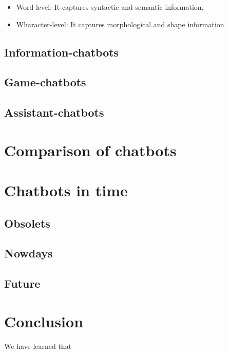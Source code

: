 \documentclass[12pt,twoside]{article}
\theoremstyle{plain}
\theoremstyle{definition}
\theoremstyle{remark}
\begin{document}
		\begin{itemize}
			\item Word-level: It captures syntactic and semantic information,
			\item Wharacter-level: It captures morphological and shape information.

		\end{itemize}
		
	 
		
		
		
	
		
	

	\subsection{Information-chatbots}
	\label{sec:information}

	\subsection{Game-chatbots}
	\label{sec:game}

	\subsection{Assistant-chatbots}
	\label{sec:assistant}
	

\section{Comparison of chatbots}
\label{sec:comparison}


\section{Chatbots in time}
\label{sec:time}

\subsection{Obsolets}
\label{sec:obsolet}

\subsection{Nowdays}
\label{sec:nowdays}

\subsection{Future}
\label{sec:future}

\section{Conclusion}
\label{sec:conclusion}

We have learned that

%
%
\nocite{*}


\newpage


\end{document}
